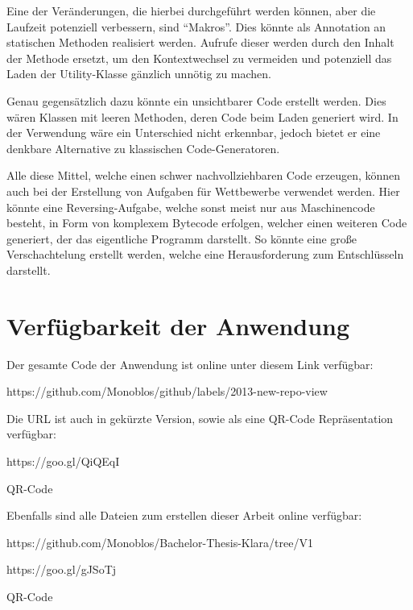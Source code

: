 Eine der Veränderungen, die hierbei durchgeführt werden können, aber die Laufzeit potenziell verbessern, sind "`Makros"'. Dies könnte als Annotation an statischen Methoden realisiert werden. Aufrufe dieser werden durch den Inhalt der Methode ersetzt, um den Kontextwechsel zu vermeiden und potenziell das Laden der Utility-Klasse gänzlich unnötig zu machen.

Genau gegensätzlich dazu könnte ein unsichtbarer Code erstellt werden. Dies wären Klassen mit leeren Methoden, deren Code beim Laden generiert wird. In der Verwendung wäre ein Unterschied nicht erkennbar, jedoch bietet er eine denkbare Alternative zu klassischen Code-Generatoren.

Alle diese Mittel, welche einen schwer nachvollziehbaren Code erzeugen, können auch bei der Erstellung von Aufgaben für Wettbewerbe verwendet werden. Hier könnte eine Reversing-Aufgabe, welche sonst meist nur aus Maschinencode besteht, in Form von komplexem Bytecode erfolgen, welcher einen weiteren Code generiert, der das eigentliche Programm darstellt. So könnte eine große Verschachtelung erstellt werden, welche eine Herausforderung zum Entschlüsseln darstellt.

\chapter{Verfügbarkeit der Anwendung}

Der gesamte Code der Anwendung ist online unter diesem Link verfügbar:

https://github.com/Monoblos/github/labels/2013-new-repo-view

Die URL ist auch in gekürzte Version, sowie als eine QR-Code Repräsentation verfügbar:

https://goo.gl/QiQEqI

QR-Code

Ebenfalls sind alle Dateien zum erstellen dieser Arbeit online verfügbar:

https://github.com/Monoblos/Bachelor-Thesis-Klara/tree/V1

https://goo.gl/gJSoTj

QR-Code